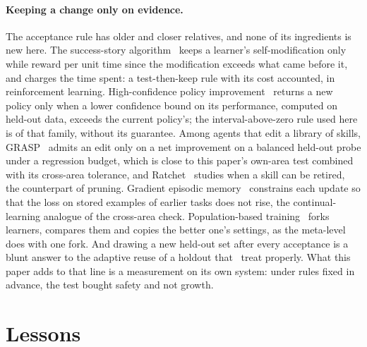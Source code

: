 \documentclass[11pt]{article}
\begin{document}
\paragraph{Keeping a change only on evidence.} The acceptance rule has older and closer relatives, and none of its ingredients is new here. The success-story algorithm~\cite{schmidhuber1997} keeps a learner's self-modification only while reward per unit time since the modification exceeds what came before it, and charges the time spent: a test-then-keep rule with its cost accounted, in reinforcement learning. High-confidence policy improvement~\cite{thomas2015} returns a new policy only when a lower confidence bound on its performance, computed on held-out data, exceeds the current policy's; the interval-above-zero rule used here is of that family, without its guarantee. Among agents that edit a library of skills, GRASP~\cite{moll2026} admits an edit only on a net improvement on a balanced held-out probe under a regression budget, which is close to this paper's own-area test combined with its cross-area tolerance, and Ratchet~\cite{zhang2026} studies when a skill can be retired, the counterpart of pruning. Gradient episodic memory~\cite{lopezpaz2017} constrains each update so that the loss on stored examples of earlier tasks does not rise, the continual-learning analogue of the cross-area check. Population-based training~\cite{jaderberg2017} forks learners, compares them and copies the better one's settings, as the meta-level does with one fork. And drawing a new held-out set after every acceptance is a blunt answer to the adaptive reuse of a holdout that~\cite{dwork2015} treat properly. What this paper adds to that line is a measurement on its own system: under rules fixed in advance, the test bought safety and not growth.

\section{Lessons}
\end{document}
